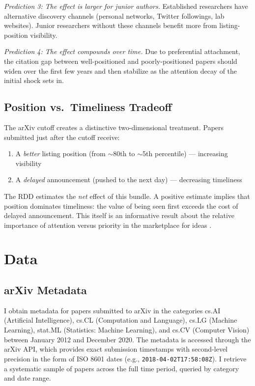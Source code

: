 \documentclass[12pt]{article}
\begin{document}
\textit{Prediction 3: The effect is larger for junior authors.} Established researchers have alternative discovery channels (personal networks, Twitter followings, lab websites). Junior researchers without these channels benefit more from listing-position visibility.

\textit{Prediction 4: The effect compounds over time.} Due to preferential attachment, the citation gap between well-positioned and poorly-positioned papers should widen over the first few years and then stabilize as the attention decay of the initial shock sets in.

\subsection{Position vs.\ Timeliness Tradeoff}

The arXiv cutoff creates a distinctive two-dimensional treatment. Papers submitted just after the cutoff receive:
\begin{enumerate}
\item A \textit{better} listing position (from $\sim$80th to $\sim$5th percentile) --- increasing visibility
\item A \textit{delayed} announcement (pushed to the next day) --- decreasing timeliness
\end{enumerate}

The RDD estimates the \textit{net} effect of this bundle. A positive estimate implies that position dominates timeliness: the value of being seen first exceeds the cost of delayed announcement. This itself is an informative result about the relative importance of attention versus priority in the marketplace for ideas \citep{strevens2003}.


\section{Data}

\subsection{arXiv Metadata}

I obtain metadata for papers submitted to arXiv in the categories cs.AI (Artificial Intelligence), cs.CL (Computation and Language), cs.LG (Machine Learning), stat.ML (Statistics: Machine Learning), and cs.CV (Computer Vision) between January 2012 and December 2020. The metadata is accessed through the arXiv API, which provides exact submission timestamps with second-level precision in the form of ISO 8601 dates (e.g., \texttt{2018-04-02T17:58:08Z}). I retrieve a systematic sample of papers across the full time period, queried by category and date range.
\end{document}
